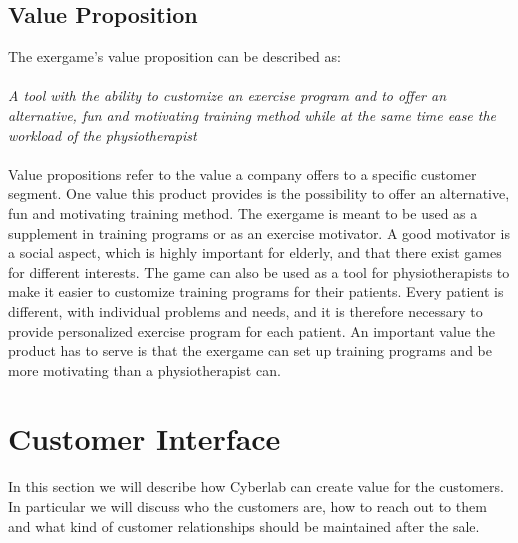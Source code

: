 \subsection{Value Proposition}
The exergame's value proposition can be described as: \\ \\
\emph{A tool with the ability to customize an exercise program and to offer an alternative, fun and motivating training method while at the same time ease the workload of the physiotherapist}\\ \\
Value propositions refer to the value a company offers to a specific customer segment. One value this product provides is the possibility to offer an alternative, fun and motivating training method. The exergame is meant to be used as a supplement in training programs or as an exercise motivator. A good motivator is a social aspect, which is highly important for elderly, and that there exist games for different interests. The game can also be used as a tool for physiotherapists to make it easier to customize training programs for their patients. Every patient is different, with individual problems and needs, and it is therefore necessary to provide personalized exercise program for each patient. An important value the product has to serve is that the exergame can set up training programs and be more motivating than a physiotherapist can. 
\section{Customer Interface}
In this section we will describe how Cyberlab can create value for the customers. In particular we will discuss who the customers are, how to reach out to them and what kind of customer relationships should be maintained after the sale. 
